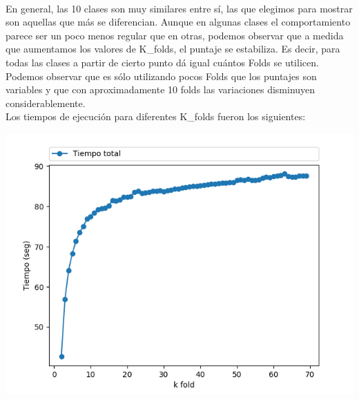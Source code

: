 





$ $\newline

En general, las 10 clases son muy similares entre sí, las que elegimos para mostrar son aquellas que más se diferencian. Aunque en algunas clases el comportamiento parece ser un poco menos regular que en otras, podemos observar que a medida que aumentamos los valores de K_folds, el puntaje se estabiliza. Es decir, para todas las clases a partir de cierto punto dá igual cuántos Folds se utilicen. Podemos observar que es sólo utilizando pocos Folds que los puntajes son variables y que con aproximadamente 10 folds las variaciones disminuyen considerablemente.\\

Los tiempos de ejecución para diferentes K_folds fueron los siguientes:

{\centering
    \includegraphics[scale=0.8]{informe/imagenes/kfold/knn/tiempokfold.png} \\
}
$ $\newline

